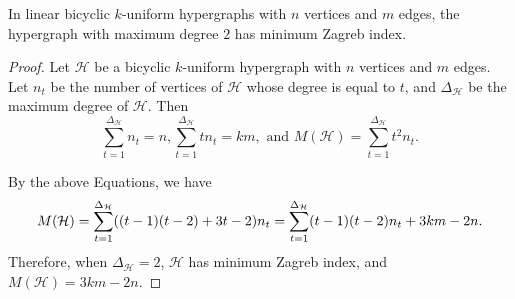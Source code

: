 \documentclass[10pt,a4paper]{amsart}
\begin{document}
\begin{thm}
In linear bicyclic $k$-uniform hypergraphs with $n$ vertices and $m$ edges, the hypergraph with maximum degree $2$ has minimum Zagreb index.
\end{thm}

\begin{proof}
Let $\mathcal{H}$ be a bicyclic $k$-uniform hypergraph with $n$ vertices and $m$ edges. Let $n_{t}$ be the number of vertices of $\mathcal{H}$  whose degree is equal to $t$, and $\Delta_{\mathcal{H}}$ be the maximum degree of $\mathcal{H}$. Then
\begin{equation*}\label{zsyzh1}
\sum\limits_{t=1}^{\Delta_{\mathcal{H}}}n_{t}=n,\sum\limits_{t=1}^{\Delta_{\mathcal{H}}}tn_{t}=km, \text{~and~} M(\mathcal{H})=\sum\limits_{t=1}^{\Delta_{\mathcal{H}}}t^{2}n_{t}.
\end{equation*}


By the above Equations, we have
$$
M(\mathcal{H})%
=\sum\limits_{t=1}^{\Delta_{\mathcal{H}}}((t-1)(t-2)+3t-2)n_{t}
=\sum\limits_{t=1}^{\Delta_{\mathcal{H}}}(t-1)(t-2)n_{t}+3km-2n.\\
$$
Therefore, when $\Delta_{\mathcal{H}}=2$, $\mathcal{H}$ has minimum Zagreb index, and $M(\mathcal{H})=3km-2n$.

\end{proof}
\end{document}
